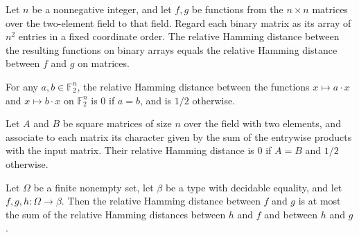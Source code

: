 \begin{theorem}
\label{FABL.relativeHammingDist_unflattenBinaryMatrix}
\leanok
{}
Let $n$ be a nonnegative integer, and let $f,g$ be functions from the $n\times n$
matrices over the two-element field to that field. Regard each binary matrix as its
array of $n^2$ entries in a fixed coordinate order. The relative Hamming distance
between the resulting functions on binary arrays equals the relative Hamming distance
between $f$ and $g$ on matrices.
\end{theorem}

\begin{theorem}
\leanok
{}
For any $a,b\in\mathbb F_2^n$, the relative Hamming distance between the functions
$x\mapsto a\cdot x$ and $x\mapsto b\cdot x$ on $\mathbb F_2^n$ is $0$ if $a=b$, and
is $1/2$ otherwise.
\end{theorem}

\begin{theorem}
\label{FABL.relativeHammingDist_binaryMatrixCharacter_eq}
\leanok
{}
Let $A$ and $B$ be square matrices of size $n$ over the field with two elements, and
associate to each matrix its character given by the sum of the entrywise products with
the input matrix. Their relative Hamming distance is $0$ if $A=B$ and $1/2$ otherwise.
\end{theorem}

\begin{theorem}
\label{FABL.relativeHammingDist_triangle_left}
\leanok
{}
Let $\Omega$ be a finite nonempty set, let $\beta$ be a type with decidable equality,
and let $f,g,h:\Omega\to\beta$. Then the relative Hamming distance between $f$ and $g$
is at most the sum of the relative Hamming distances between $h$ and $f$ and between $h$
and $g$.
\end{theorem}

